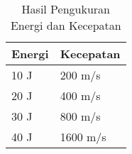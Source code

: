 \begin{longtable}{|l|l|}
	\caption{Hasil Pengukuran Energi dan Kecepatan}
	\label{tb:energiKecepatan}\\
  \hline
  \rowcolor[HTML]{C0C0C0}
  \textbf{Energi} & \textbf{Kecepatan} \\ \hline
	10 J & 200 m/s \\ \hline
	20 J & 400 m/s \\ \hline
	30 J & 800 m/s \\ \hline
	40 J & 1600 m/s \\ \hline
\end{longtable}